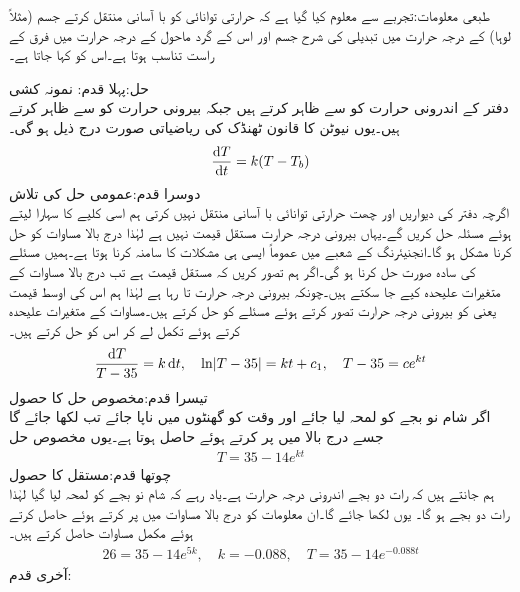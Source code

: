 طبعی معلومات:تجربے سے معلوم کیا گیا ہے کہ حرارتی توانائی کو با آسانی منتقل کرتے جسم (مثلاً لوہا) کے درجہ حرارت میں تبدیلی کی شرح جسم اور اس کے گرد ماحول کے درجہ حرارت میں فرق کے راست تناسب  ہوتا ہے۔اس کو  کہا جاتا ہے۔

حل:پہلا قدم: نمونہ کشی \\
دفتر کے اندرونی حرارت کو  سے ظاہر کرتے ہیں جبکہ بیرونی حرارت کو  سے ظاہر کرتے ہیں۔یوں نیوٹن کا قانون ٹھنڈک کی ریاضیاتی صورت درج ذیل ہو گی۔
\begin{align}
\frac{\dif T}{\dif t}=k(T-T_b)
\end{align}
دوسرا قدم:عمومی حل کی تلاش\\
اگرچہ دفتر کی دیواریں اور چھت حرارتی توانائی با آسانی منتقل نہیں کرتی ہم اسی کلیے کا سہارا لیتے ہوئے مسئلہ حل کریں گے۔یہاں بیرونی درجہ حرارت مستقل قیمت نہیں ہے لہٰذا درج بالا مساوات کو حل کرنا مشکل ہو گا۔انجنیئرنگ کے شعبے میں عموماً ایسی ہی مشکلات کا سامنہ کرنا ہوتا ہے۔ہمیں مسئلے کی سادہ صورت حل کرنا ہو گی۔اگر ہم تصور کریں کہ  مستقل قیمت ہے تب درج بالا مساوات کے متغیرات علیحدہ کیے جا سکتے ہیں۔چونکہ بیرونی درجہ حرارت  تا  رہا ہے لہٰذا ہم اس کی اوسط قیمت یعنی  کو بیرونی درجہ حرارت تصور کرتے ہوئے مسئلے کو حل کرتے ہیں۔مساوات کے متغیرات علیحدہ کرتے ہوئے تکمل لے کر اس کو حل کرتے ہیں۔
\begin{align*}
\frac{\dif T}{T-35}=k\dif t, \quad \ln\abs{T-35}=kt+c_1,\quad T-35=ce^{kt}
\end{align*}
تیسرا قدم:مخصوص حل کا حصول\\
اگر شام نو بجے کو لمحہ  لیا جائے اور وقت کو گھنٹوں میں ناپا جائے تب  لکھا جائے گا جسے درج بالا میں پر کرتے ہوئے  حاصل ہوتا ہے۔یوں مخصوص حل
\begin{align*}
T=35-14e^{kt}
\end{align*}
چوتھا قدم:مستقل  کا حصول\\
ہم جانتے ہیں کہ رات دو بجے  اندرونی درجہ حرارت   ہے۔یاد رہے کہ شام نو بجے کو لمحہ  لیا گیا لہٰذا رات دو بجے  ہو گا۔
یوں  لکھا جائے گا۔ان معلومات کو درج بالا مساوات میں پر کرتے ہوئے  حاصل کرتے ہوئے مکمل مساوات حاصل کرتے ہیں۔
\begin{align*}
26=35-14e^{5k},\quad k=-0.088, \quad T=35-14e^{-0.088t}
\end{align*}
آخری قدم:\\
